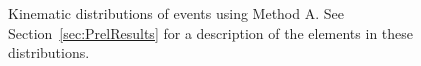 \documentclass[12pt,twoside,letterpaper,doublespace]{article}
\begin{document}
\begin{figure}[h!]
\centering
\caption[Method A \phoonejet]{Kinematic distributions of \photwojet events using Method A. See Section~\ref{sec:PrelResults} for a description of the elements in these distributions.}
\subfigure[]

\end{figure}
\end{document}
